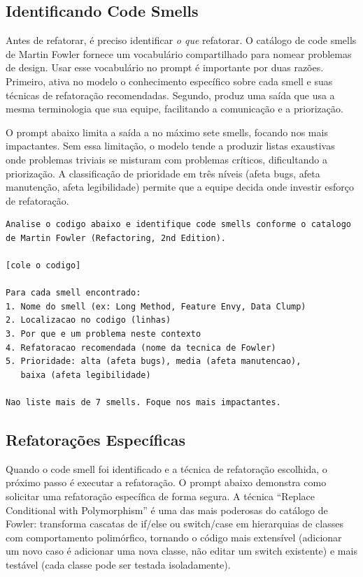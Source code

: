 \subsection{Identificando Code Smells}

Antes de refatorar, é preciso identificar \textit{o que} refatorar. O catálogo
de code smells de Martin Fowler fornece um vocabulário compartilhado para nomear
problemas de design. Usar esse vocabulário no prompt é importante por duas razões.
Primeiro, ativa no modelo o conhecimento específico sobre cada smell e suas
técnicas de refatoração recomendadas. Segundo, produz uma saída que usa a mesma
terminologia que sua equipe, facilitando a comunicação e a priorização.

O prompt abaixo limita a saída a no máximo sete smells, focando nos mais
impactantes. Sem essa limitação, o modelo tende a produzir listas exaustivas
onde problemas triviais se misturam com problemas críticos, dificultando a
priorização. A classificação de prioridade em três níveis (afeta bugs, afeta
manutenção, afeta legibilidade) permite que a equipe decida onde investir
esforço de refatoração.

\begin{lstlisting}[language={}, caption={Prompt para identificação de code smells}]
Analise o codigo abaixo e identifique code smells conforme o catalogo
de Martin Fowler (Refactoring, 2nd Edition).

[cole o codigo]

Para cada smell encontrado:
1. Nome do smell (ex: Long Method, Feature Envy, Data Clump)
2. Localizacao no codigo (linhas)
3. Por que e um problema neste contexto
4. Refatoracao recomendada (nome da tecnica de Fowler)
5. Prioridade: alta (afeta bugs), media (afeta manutencao),
   baixa (afeta legibilidade)

Nao liste mais de 7 smells. Foque nos mais impactantes.
\end{lstlisting}

\subsection{Refatorações Específicas}

Quando o code smell foi identificado e a técnica de refatoração escolhida, o
próximo passo é executar a refatoração. O prompt abaixo demonstra como solicitar
uma refatoração específica de forma segura. A técnica ``Replace Conditional with
Polymorphism'' é uma das mais poderosas do catálogo de Fowler: transforma cascatas
de if/else ou switch/case em hierarquias de classes com comportamento polimórfico,
tornando o código mais extensível (adicionar um novo caso é adicionar uma nova
classe, não editar um switch existente) e mais testável (cada classe pode ser
testada isoladamente).

